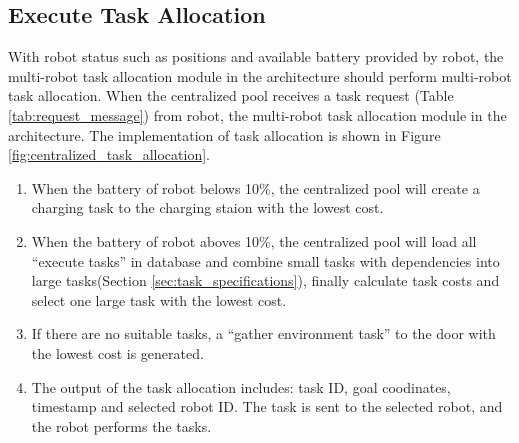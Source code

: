 \subsection{Execute Task Allocation}
\label{sec:exe_task_allocation}
With robot status such as positions and available battery provided by robot, the multi-robot task allocation module in the architecture should perform multi-robot task allocation. 
When the centralized pool receives a task request (Table \ref{tab:request_message}) from robot,  the multi-robot task allocation module in the architecture. The implementation of task allocation is shown in Figure \ref{fig:centralized_task_allocation}. 
\begin{enumerate}
	\item When the battery of robot belows 10\%, the centralized pool will create a charging task to the charging staion with the lowest cost.
	\item When the battery of robot aboves 10\%, the centralized pool will load all ``execute tasks'' in database and combine small tasks with dependencies into large tasks(Section \ref{sec:task_specifications}), finally calculate task costs and select one large task with the lowest cost. 
    \item If there are no suitable tasks, a ``gather environment task'' to the door with the lowest cost is generated. 
    \item The output of the task allocation includes: task ID, goal coodinates, timestamp and selected robot ID. The task is sent to the selected robot, and the robot performs the tasks.

\end{enumerate}


